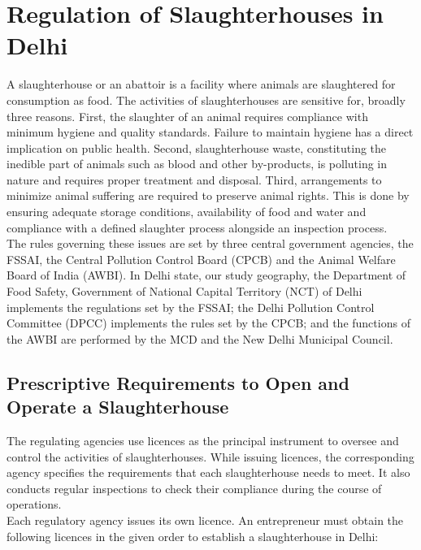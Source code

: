 \documentclass[a4paper, 12pt]{article}
\begin{document}
\section{Regulation of Slaughterhouses in Delhi}

A slaughterhouse or an abattoir is a facility where animals are slaughtered for consumption as food. The activities of slaughterhouses are sensitive for, broadly three reasons. First, the slaughter of an animal requires compliance with minimum hygiene and quality standards. Failure to maintain hygiene has a direct implication on public health. Second, slaughterhouse waste, constituting the inedible part of animals such as blood and other by-products, is polluting in nature and requires proper treatment and disposal. Third, arrangements to minimize animal suffering are required to preserve animal rights. This is done by ensuring adequate storage conditions, availability of food and water and compliance with a defined slaughter process alongside an inspection process.\\

The rules governing these issues are set by three central government agencies, the FSSAI, the Central Pollution Control Board (CPCB) and the Animal Welfare Board of India (AWBI). In Delhi state, our study geography, the Department of Food Safety, Government of National Capital Territory (NCT) of Delhi implements the regulations set by the FSSAI; the Delhi Pollution Control Committee (DPCC) implements the rules set by the CPCB; and the functions of the AWBI are performed by the MCD and the New Delhi Municipal Council.\\

\subsection{Prescriptive Requirements to Open and Operate a Slaughterhouse}

The regulating agencies use licences as the principal instrument to oversee and control the activities of slaughterhouses. While issuing licences, the corresponding agency specifies the requirements that each slaughterhouse needs to meet. It also conducts regular inspections to check their compliance during the course of operations. \\

Each regulatory agency issues its own licence. An entrepreneur must obtain the following licences in the given order to establish a slaughterhouse in Delhi:\\
\end{document}
